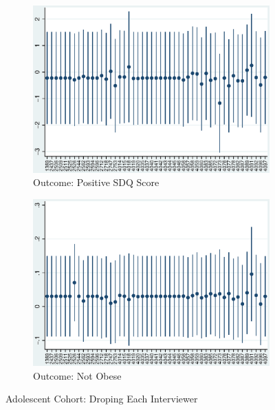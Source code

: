     \begin{figure}[H]
      \centering
        \begin{subfigure}[t]{0.75\textwidth}
          \includegraphics[width=\textwidth]{../../../output/image/coef-interviewer-adol-pos_childSDQ_score_PmDiD.eps}       
\caption{Outcome: Positive SDQ Score}        
        \end{subfigure}
        \begin{subfigure}[t]{0.75\textwidth}
          \includegraphics[width=\textwidth]{../../../output/image/coef-interviewer-adol-BMI_obese_PmDiD.eps}       
 \caption{Outcome: Not Obese}        
        \end{subfigure}
      \caption{Adolescent Cohort: Droping Each Interviewer}  \label{fig:adol-sensitivity-interviewer_PmDiD}
    \end{figure}


